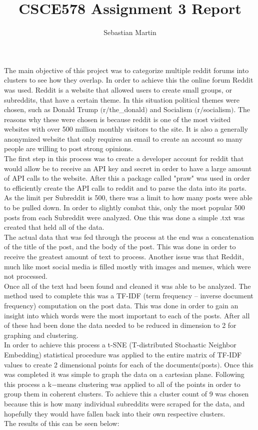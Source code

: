 \documentclass{article}
\title{
CSCE578 Assignment 3 Report
}
\author{Sebastian Martin}
\begin{document}
\maketitle


\begin{addmargin}[4em]{4em}
The main objective of this project was to categorize multiple reddit forums into clusters to see how they overlap. In order to achieve this the online forum Reddit was used. Reddit is a website that allowed users to create small groups, or subreddits, that have a certain theme. In this situation political themes were chosen, such as Donald Trump $($r$/$the\_donald$)$ and Socialism $($r$/$socialism$)$. The reasons why these were chosen is because reddit is one of the most visited websites with over 500 million monthly visitors to the site. It is also a generally anonymized website that only requires an email to create an account so many people are willing to post strong opinions.
\\
The first step in this process was to create a developer account for reddit that would allow be to receive an API key and secret in order to have a large amount of API calls to the website. After this a package called "praw" was used in order to efficiently create the API calls to reddit and to parse the data into its parts. As the limit per Subreddit is 500, there was a limit to how many posts were able to be pulled down. In order to slightly combat this, only the most popular 500 posts from each Subreddit were analyzed. One this was done a simple .txt was created that held all of the data. \\
The actual data that was fed through the process at the end was a concatenation of the title of the post, and the body of the post. This was done in order to receive the greatest amount of text to process. Another issue was that Reddit, much like most social media is filled mostly with images and memes, which were not processed.
\\ 
Once all of the text had been found and cleaned it was able to be analyzed.
The method used to complete this was a TF-IDF (term frequency – inverse document frequency) computation on the post data. This was done in order to gain an insight into which words were the most important to each of the posts. After all of these had been done the data needed to be reduced in dimension to 2 for graphing and clustering.
\\
In order to achieve this process a t-SNE (T-distributed Stochastic Neighbor Embedding) statistical procedure was applied to the entire matrix of TF-IDF values to create 2 dimensional points for each of the documents$($posts$)$. Once this was completed it was simple to graph the data on a cartesian plane. Following this process a k$-$means clustering was applied to all of the points in order to group them in coherent clusters. To achieve this a cluster count of 9 was chosen because this is how many individual subreddits were scraped for the data, and hopefully they would have fallen back into their own respective clusters. 
\\
The results of this can be seen below:\\
\end{addmargin}
\end{document}
